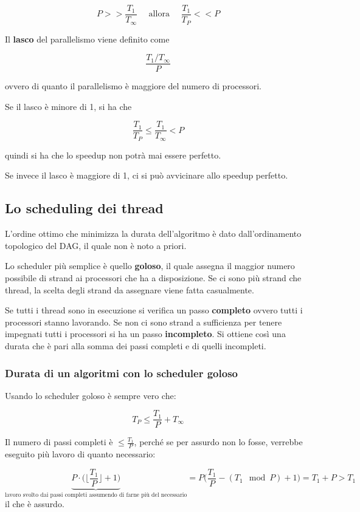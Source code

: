 $$P >> \frac{T_1}{T_\infty} \quad \text{ allora } \quad \frac{T_1}{T_P} << P$$

Il \textbf{lasco} del parallelismo viene definito come

$$\frac{T_1/T_\infty}{P}$$

ovvero di quanto il parallelismo è maggiore del numero di processori.

Se il lasco è minore di 1, si ha che 

$$\frac{T_1}{T_P} \leq \frac{T_1}{T_\infty} < P$$

quindi si ha che lo speedup non potrà mai essere perfetto. 

Se invece il lasco è maggiore di 1, ci si può avvicinare allo speedup perfetto.

\subsection{Lo scheduling dei thread}\label{lo-scheduling-dei-thread}

L'ordine ottimo che minimizza la durata dell'algoritmo è dato dall'ordinamento topologico del DAG, il quale non è noto a priori.

Lo scheduler più semplice è quello \textbf{goloso}, il quale assegna il maggior numero possibile di strand ai processori che ha a disposizione. Se ci sono più strand che thread, la scelta degli strand da assegnare viene fatta casualmente.

Se tutti i thread sono in esecuzione si verifica un passo \textbf{completo} ovvero tutti i processori stanno lavorando. 
Se non ci sono strand a sufficienza per tenere impegnati tutti i processori si ha un passo \textbf{incompleto}. 
Si ottiene così una durata che è pari alla somma dei passi completi e di quelli incompleti.

\subsubsection{Durata di un algoritmi con lo scheduler goloso}

Usando lo scheduler goloso è sempre vero che:

$$T_P \leq \frac{T_1}{P} + T_\infty$$

Il numero di passi completi è $\leq \frac{T_1}{P}$, perché se per assurdo non lo fosse, verrebbe eseguito più lavoro di quanto necessario:

$$
\underbrace{P \cdot \bigg(\bigg\lfloor \frac{T_1}{P}\bigg\rfloor +1 \bigg)}_{\text{lavoro svolto dai passi completi assumendo di farne più del necessario}} = P \bigg( \frac{T_1}{P} - (T_1 \mod P) +1 \bigg) = T_1 + P > T_1
$$
 il che è assurdo.

